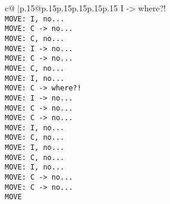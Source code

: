 \documentclass{article}
\begin{document}
{\begin{supertabular}{c@{$\;$}|p{.15\linewidth}@{}p{.15\linewidth}p{.15\linewidth}p{.15\linewidth}p{.15\linewidth}p{.15\linewidth}}
{{{ I -> where?!\\ \tt  MOVE: I, no...\\ \tt  MOVE: C -> no...\\ \tt  MOVE: C, no...\\ \tt  MOVE: I -> no...\\ \tt  MOVE: C -> no...\\ \tt  MOVE: C, no...\\ \tt  MOVE: I, no...\\ \tt  MOVE: C -> where?!\\ \tt  MOVE: I -> no...\\ \tt  MOVE: C -> no...\\ \tt  MOVE: C -> no...\\ \tt  MOVE: I, no...\\ \tt  MOVE: C, no...\\ \tt  MOVE: I, no...\\ \tt  MOVE: C, no...\\ \tt  MOVE: I, no...\\ \tt  MOVE: C -> no...\\ \tt  MOVE: C -> no...\\ \tt  MOVE}}}
\end{supertabular}}
\end{document}
